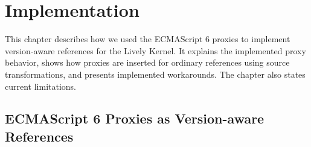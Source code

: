 \chapter{Implementation} \label{chapter:IMPLEMENTATION}

This chapter describes how we used the ECMAScript 6 proxies to implement version-aware references for the Lively Kernel.
It explains the implemented proxy behavior, shows how proxies are inserted for ordinary references using source transformations, and presents implemented workarounds.
The chapter also states current limitations.










\section{ECMAScript 6 Proxies as Version-aware References} \label{sec:IMPLEMENTATION:1}



